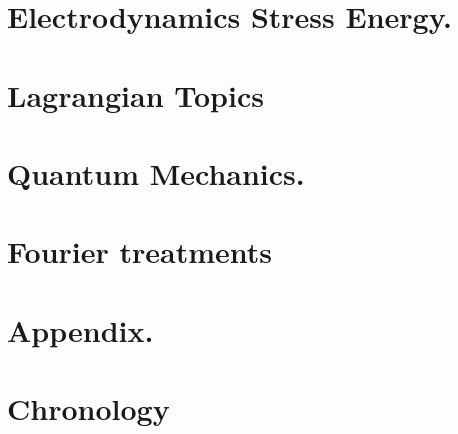 \documentclass[12pt,leqno]{book}
\begin{document}
\part{Electrodynamics Stress Energy.}











\part{Lagrangian Topics}






\part{Quantum Mechanics.}








\part{Fourier treatments}









\part{Appendix.}





\part{Chronology}

\end{document}

